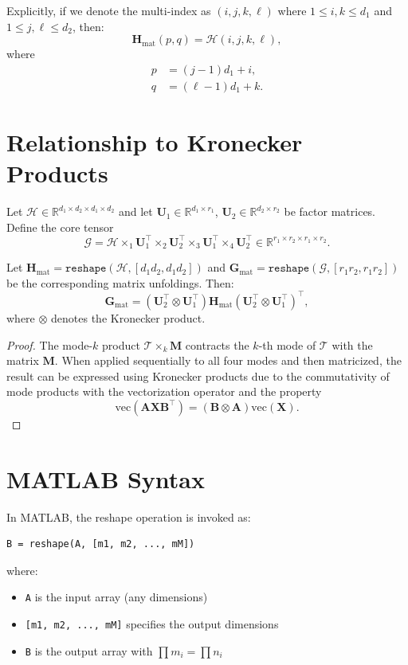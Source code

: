 \documentclass[11pt]{article}
\begin{document}
Explicitly, if we denote the multi-index as $(i, j, k, \ell)$ where $1 \leq i,k \leq d_1$ and $1 \leq j,\ell \leq d_2$, then:
\[
\bm{H}_{\text{mat}}(p, q) = \mathcal{H}(i, j, k, \ell),
\]
where
\begin{align*}
p &= (j-1)d_1 + i, \\
q &= (\ell-1)d_1 + k.
\end{align*}

\section{Relationship to Kronecker Products}

\begin{theorem}
Let $\mathcal{H} \in \mathbb{R}^{d_1 \times d_2 \times d_1 \times d_2}$ and let $\bm{U}_1 \in \mathbb{R}^{d_1 \times r_1}$, $\bm{U}_2 \in \mathbb{R}^{d_2 \times r_2}$ be factor matrices. Define the core tensor
\[
\mathcal{G} = \mathcal{H} \times_1 \bm{U}_1^\top \times_2 \bm{U}_2^\top \times_3 \bm{U}_1^\top \times_4 \bm{U}_2^\top \in \mathbb{R}^{r_1 \times r_2 \times r_1 \times r_2}.
\]

Let $\bm{H}_{\text{mat}} = \texttt{reshape}(\mathcal{H}, [d_1 d_2, d_1 d_2])$ and $\bm{G}_{\text{mat}} = \texttt{reshape}(\mathcal{G}, [r_1 r_2, r_1 r_2])$ be the corresponding matrix unfoldings. Then:
\[
\bm{G}_{\text{mat}} = (\bm{U}_2^\top \otimes \bm{U}_1^\top) \bm{H}_{\text{mat}} (\bm{U}_2^\top \otimes \bm{U}_1^\top)^\top,
\]
where $\otimes$ denotes the Kronecker product.
\end{theorem}

\begin{proof}
The mode-$k$ product $\mathcal{T} \times_k \bm{M}$ contracts the $k$-th mode of $\mathcal{T}$ with the matrix $\bm{M}$. When applied sequentially to all four modes and then matricized, the result can be expressed using Kronecker products due to the commutativity of mode products with the vectorization operator and the property
\[
\text{vec}(\bm{A}\bm{X}\bm{B}^\top) = (\bm{B} \otimes \bm{A}) \text{vec}(\bm{X}).
\]
\end{proof}

\section{MATLAB Syntax}

In MATLAB, the reshape operation is invoked as:
\begin{verbatim}
B = reshape(A, [m1, m2, ..., mM])
\end{verbatim}
where:
\begin{itemize}
    \item \texttt{A} is the input array (any dimensions)
    \item \texttt{[m1, m2, ..., mM]} specifies the output dimensions
    \item \texttt{B} is the output array with $\prod m_i = \prod n_i$
\end{itemize}
\end{document}
